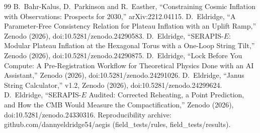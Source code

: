 \documentclass[aps,prd,twocolumn,superscriptaddress,nofootinbib,showkeys]{revtex4-2}
\begin{document}
\begin{thebibliography}{99}
 B.~Bahr-Kalus, D.~Parkinson and R.~Easther, ``Constraining Cosmic Inflation with Observations: Prospects for 2030,'' arXiv:2212.04115.
 D.~Eldridge, ``A Parameter-Free Consistency Relation for Plateau Inflation with an Uplift Ramp,'' Zenodo (2026), doi:10.5281/zenodo.24290583.
 D.~Eldridge, ``SERAPIS-$E$: Modular Plateau Inflation at the Hexagonal Torus with a One-Loop String Tilt,'' Zenodo (2026), doi:10.5281/zenodo.24290875.
 D.~Eldridge, ``Lock Before You Compute: A Pre-Registration Workflow for Theoretical Physics Done with an AI Assistant,'' Zenodo (2026), doi:10.5281/zenodo.24291026.
 D.~Eldridge, ``Janus String Calculator,'' v1.2, Zenodo (2026), doi:10.5281/zenodo.24299624.
 D.~Eldridge, ``SERAPIS-$E$ Audited: Corrected Reheating, a Point Prediction, and How the CMB Would Measure the Compactification,'' Zenodo (2026), doi:10.5281/zenodo.24330316.
 Reproducibility archive: github.com/dannyeldridge54/aegis (field\_tests/rules, field\_tests/results).
\end{thebibliography}
\end{document}
